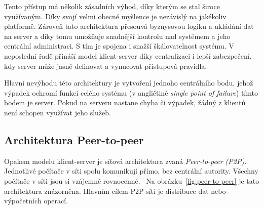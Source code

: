 
Tento přístup má několik zásadních výhod, díky kterým se stal
široce využívaným. Díky svojí velmi obecné myšlence je nezávislý
na jakékoliv platformě.
Zároveň tato architektura přesouvá byznysovou logiku a
ukládání dat na server a díky tomu umožňuje
snadnější kontrolu nad systémem a jeho centrální administraci. S tím
je spojena i snažší škálovatelnost systému. V neposlední řadě
přináší model klient-server díky centralizaci i lepší zabezpečení,
kdy server může jasně definovat a vynucovat přístupová pravidla.

Hlavní nevýhodu této architektury je vytvoření jednoho centrálního bodu,
jehož výpadek ochromí funkci celého systému (v angličtině
\textit{single point of failure}) \textendash\xspace tímto bodem je server.
Pokud na serveru nastane chyba či výpadek, žádný z klientů není schopen využívat
jeho služeb.


\subsection{Architektura Peer-to-peer}\label{sec:p2p}

Opakem modelu klient-server je síťová architektura zvaná \textit{Peer-to-peer (\gls{P2P})}.
Jednotlivé počítače v síti spolu komunikují přímo, bez centrální autority.
Všechny počítače v síti jsou si vzájemně rovnocenné.~\cite{fox2001peer}
Na obrázku~\ref{fig:peer-to-peer} je tato architektura znázorněna.
Hlavním cílem \gls{P2P} sítí je distribuce dat nebo výpočetních operací.

